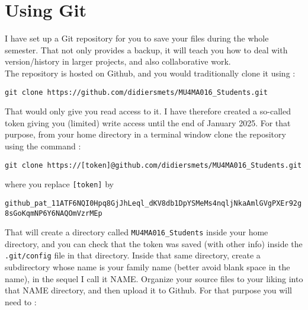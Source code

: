 \documentclass[a4paper,12pt]{article}
\begin{document}
\section{Using Git}
I have set up a Git repository for you to save your files during the whole
semester. That not only provides a backup, it will teach you how to deal with
version/history in larger projects, and also collaborative work.\\
The repository is hosted on Github, and you would traditionally clone it
using :
\begin{center}
{\tt git clone https://github.com/didiersmets/MU4MA016\_Students.git} 
\end{center}
That would only give you read access to it. I have therefore created a so-called token 
giving you (limited) write access until the end of January 2025. For that purpose, from 
your home directory in a terminal window clone the repository using 
the command :
\begin{center}
	{\tt git clone https://[token]@github.com/didiersmets/MU4MA016\_Students.git} 
\end{center}
where you replace {\tt [token]} by 
\begin{center}
	{\tt \scriptsize github\_pat\_11ATF6NQI0Hpq8GjJhLeql\_dKV8db1DpYSMeMs4nqljNkaAmlGVgPXEr92g8sGoKqmNP6Y6NAQOmVzrMEp}
\end{center}
That will create a directory called {\tt MU4MA016\_Students} inside your home
directory, and you can check that the token was saved (with other info) 
inside the {\tt .git/config} file in that directory. Inside that same directory, 
create a subdirectory whose name is your family name (better avoid blank space 
in the name), in the sequel I call it NAME. Organize your source files to your 
liking into that NAME directory, and then upload it to Github. For that purpose 
you will need to :
\end{document}
